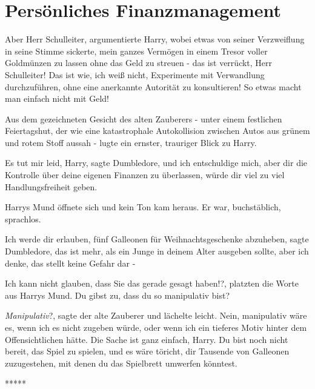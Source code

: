 \chapter{Persönliches Finanzmanagement}

\glqq{}Aber Herr Schulleiter\grqq{}, argumentierte Harry, wobei etwas von seiner
Verzweiflung in seine Stimme sickerte, \glqq{}mein ganzes Vermögen in einem
Tresor voller Goldmünzen zu lassen ohne das Geld zu streuen - das ist verrückt,
Herr Schulleiter! Das ist wie, ich weiß nicht, Experimente mit Verwandlung
durchzuführen, ohne eine anerkannte Autorität zu konsultieren! So etwas macht
man einfach nicht mit Geld!\grqq{}

Aus dem gezeichneten Gesicht des alten Zauberers - unter einem festlichen
Feiertagshut, der wie eine katastrophale Autokollision zwischen Autos aus grünem
und rotem Stoff aussah - lugte ein ernster, trauriger Blick zu Harry.

\glqq{}Es tut mir leid, Harry\grqq{}, sagte Dumbledore, \glqq{}und ich
entschuldige mich, aber dir die Kontrolle über deine eigenen Finanzen zu
überlassen, würde dir viel zu viel Handlungsfreiheit geben.\grqq{}

Harrys Mund öffnete sich und kein Ton kam heraus. Er war, buchstäblich,
sprachlos.

\glqq{}Ich werde dir erlauben, fünf Galleonen für Weihnachtsgeschenke
abzuheben\grqq{}, sagte Dumbledore, \glqq{}das ist mehr, als ein Junge in deinem
Alter ausgeben sollte, aber ich denke, das stellt keine Gefahr dar -\grqq{}

\glqq{}Ich kann nicht glauben, dass Sie das gerade gesagt haben!?\grqq{},
platzten die Worte aus Harrys Mund. \glqq{}Du gibst zu, dass du so manipulativ
bist?\grqq{}

\glqq{}\emph{Manipulativ}?\grqq{}, sagte der alte Zauberer und lächelte leicht.
\glqq{}Nein, manipulativ wäre es, wenn ich es nicht zugeben würde, oder wenn ich
ein tieferes Motiv hinter dem Offensichtlichen hätte. Die Sache ist ganz
einfach, Harry. Du bist noch nicht bereit, das Spiel zu spielen, und es wäre
töricht, dir Tausende von Galleonen zuzugestehen, mit denen du das Spielbrett
umwerfen könntest.\grqq{}

\begin{center}*****\end{center}


